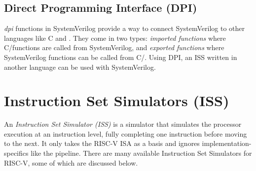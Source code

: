 \subsection{Direct Programming Interface (DPI)}
\label{sec:bg_dpi}

\textit{\acrfull{dpi}} functions in SystemVerilog provide a way to connect SystemVerilog to other languages like C and \cpp \cite{spearSystemVerilogVerificationGuide2012}. They come in two types: \textit{imported functions} where C/\cpp functions are called from  SystemVerilog, and \textit{exported functions} where SystemVerilog functions can be called from C/\cpp. Using DPI, an ISS written in another language can be used with SystemVerilog. 


\section{Instruction Set Simulators (ISS) }
\label{sec:bg_iss}

An \textit{Instruction Set Simulator (ISS)} is a simulator that simulates the processor execution at an instruction level, fully completing one instruction before moving to the next.
It only takes the RISC-V ISA as a basis and ignores implementation-specifics like the pipeline.
There are many available Instruction Set Simulators for RISC-V, some of which are discussed below.

